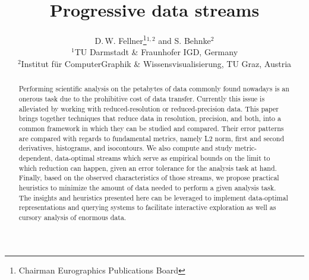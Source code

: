\documentclass{egpubl}
\title[EG \LaTeX\ Author Guidelines]%
{Progressive data streams}
\author[D. Fellner \& S. Behnke]
{D.\,W. Fellner\thanks{Chairman Eurographics Publications Board}$^{1,2}$
  and S. Behnke$^{2}$
  \\
  $^1$TU Darmstadt \& Fraunhofer IGD, Germany\\
  $^2$Institut f{\"u}r ComputerGraphik \& Wissensvisualisierung, TU Graz, Austria
}
\begin{document}
  

\maketitle

\newcommand{\norm}[1]{\left\lVert#1\right\rVert}
\begin{abstract}
Performing scientific analysis on the petabytes of data commonly found nowadays is an onerous task
due to the prohibitive cost of data transfer. Currently this issue is alleviated by working with
reduced-resolution or reduced-precision data. This paper brings together techniques that reduce data
in resolution, precision, and both, into a common framework in which they can be studied and
compared. Their error patterns are compared with regards to fundamental metrics, namely L2 norm,
first and second derivatives, histograms, and isocontours. We also compute and study
metric-dependent, data-optimal streams which serve as empirical bounds on the limit to which
reduction can happen, given an error tolerance for the analysis task at hand. Finally, based on the
observed characteristics of those streams, we propose practical heuristics to minimize the amount of
data needed to perform a given analysis task. The insights and heuristics presented here can be
leveraged to implement data-optimal representations and querying systems to facilitate interactive
exploration as well as cursory analysis of enormous data.  
\begin{classification} %
\end{classification}
  
\end{abstract}












\end{document}
